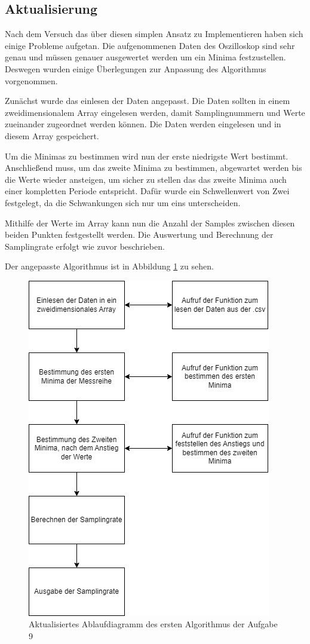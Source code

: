 \subsection{Aktualisierung}
Nach dem Versuch das über diesen simplen Ansatz zu Implementieren haben sich einige Probleme aufgetan.
Die aufgenommenen Daten des Oszilloskop sind sehr genau und müssen genauer ausgewertet werden um ein Minima festzustellen.
Deswegen wurden einige Überlegungen zur Anpassung des Algorithmus vorgenommen.\par
Zunächst wurde das einlesen der Daten angepasst.
Die Daten sollten in einem zweidimensionalem Array eingelesen werden, damit Samplingnummern und Werte zueinander zugeordnet werden können.
Die Daten werden eingelesen und in diesem Array gespeichert.\par
Um die Minimas zu bestimmen wird nun der erste niedrigste Wert bestimmt.
Anschließend muss, um das zweite Minima zu bestimmen, abgewartet werden bis die Werte wieder ansteigen, um sicher zu stellen das das zweite Minima auch einer kompletten Periode entspricht.
Dafür wurde ein Schwellenwert von Zwei festgelegt, da die Schwankungen sich nur um eins unterscheiden.\par
Mithilfe der Werte im Array kann nun die Anzahl der Samples zwischen diesen beiden Punkten festgestellt werden.
Die Auswertung und Berechnung der Samplingrate erfolgt wie zuvor beschrieben.\par
Der angepasste Algorithmus ist in Abbildung \ref{algo1.1} zu sehen.

\begin{figure}[h]
	\centering
	\includegraphics[scale=0.5]{Images/aufgabe9_algo1.1.png}
	\caption{Aktualisiertes Ablaufdiagramm des ersten Algorithmus der Aufgabe 9}
	\label{algo1.1}
\end{figure}

